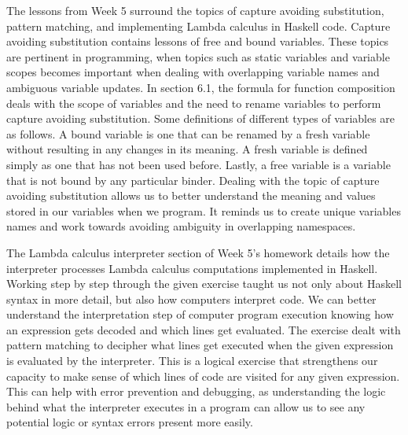\documentclass{article}
\theoremstyle{theorem}
\theoremstyle{definition}
\theoremstyle{remark}
\begin{document}
The lessons from Week 5 surround the topics of capture avoiding substitution, pattern matching, and implementing Lambda calculus in Haskell code. Capture avoiding substitution contains lessons of free and bound variables. These topics are pertinent in programming, when topics such as static variables and variable scopes becomes important when dealing with overlapping variable names and ambiguous variable updates. In section 6.1, the formula for function composition deals with the scope of variables and the need to rename variables to perform capture avoiding substitution. Some definitions of different types of variables are as follows. A bound variable is one that can be renamed by a fresh variable without resulting in any changes in its meaning. A fresh variable is defined simply as one that has not been used before. Lastly, a free variable is a variable that is not bound by any particular binder. Dealing with the topic of capture avoiding substitution allows us to better understand the meaning and values stored in our variables when we program. It reminds us to create unique variables names and work towards avoiding ambiguity in overlapping namespaces. 

The Lambda calculus interpreter section of Week 5's homework details how the interpreter processes Lambda calculus computations implemented in Haskell. Working step by step through the given exercise taught us not only about Haskell syntax in more detail, but also how computers interpret code. We can better understand the interpretation step of computer program execution knowing how an expression gets decoded and which lines get evaluated. The exercise dealt with pattern matching to decipher what lines get executed when the given expression is evaluated by the interpreter. This is a logical exercise that strengthens our capacity to make sense of which lines of code are visited for any given expression. This can help with error prevention and debugging, as understanding the logic behind what the interpreter executes in a program can allow us to see any potential logic or syntax errors present more easily.  
\end{document}

